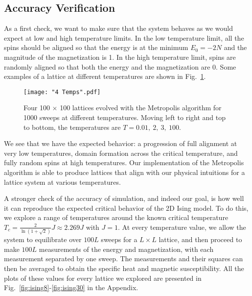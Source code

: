 \documentclass[twocolumn,aps]{revtex4-1} %
\begin{document}
\subsection{Accuracy Verification}
As a first check, we want to make sure that the system behaves as we would expect at low and high temperature limits. In the low temperature limit, all the spins should be aligned so that the energy is at the minimum $E_0 = -2N$ and the magnitude of the magnetization is 1. In the high temperature limit, spins are randomly aligned so that both the energy and the magnetization are 0. Some examples of a lattice at different temperatures are shown in Fig.~\ref{fig:4temps}. 
\begin{figure}
	\texttt{[image: "4 Temps".pdf]}
	\caption{\label{fig:4temps} Four 100 $\times$ 100 lattices evolved with the Metropolis algorithm for 1000 sweeps at different temperatures. Moving left to right and top to bottom, the temperatures are $T = 0.01,\ 2,\ 3,\ 100$.}
\end{figure}

We see that we have the expected behavior: a progression of full alignment at very low temperatures, domain formation across the critical temperature, and fully random spins at high temperatures. Our implementation of the Metropolis algorithm is able to produce lattices that align with our physical intuitions for a lattice system at various temperatures.

A stronger check of the accuracy of simulation, and indeed our goal, is how well it can reproduce the expected critical behavior of the 2D Ising model. To do this, we explore a range of temperatures around the known critical temperature $T_c = \frac{2}{\ln(1+\sqrt{2})}J \approx 2.269J$ with $J = 1$. At every temperature value, we allow the system to equilibrate over $100L$ sweeps for a $L \times L$ lattice, and then proceed to make $100L$ measurements of the energy and magnetization, with each measurement separated by one sweep. The measurements and their squares can then be averaged to obtain the specific heat and magnetic susceptibility. All the plots of these values for every lattice we explored are presented in Fig.~\ref{fig:ising8}-\ref{fig:ising30} in the Appendix.
\end{document}
